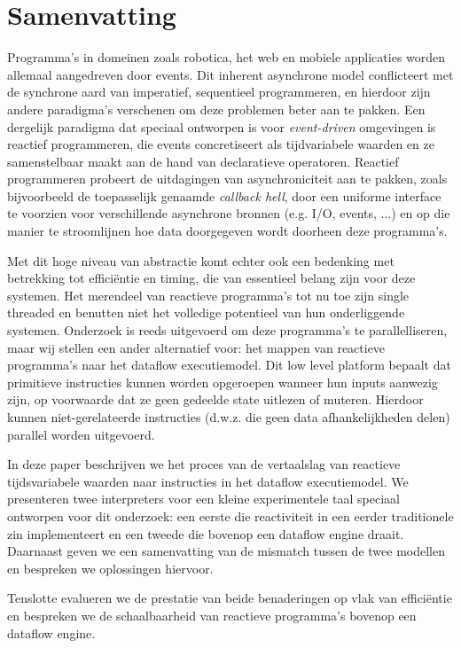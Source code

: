 \section*{Samenvatting}

Programma's in domeinen zoals robotica, het web en mobiele applicaties worden allemaal aangedreven door events. Dit inherent asynchrone model conflicteert met de synchrone aard van imperatief, sequentieel programmeren, en hierdoor zijn andere paradigma's verschenen om deze problemen beter aan te pakken. Een dergelijk paradigma dat speciaal ontworpen is voor \textit{event-driven} omgevingen is reactief programmeren, die events concretiseert als tijdvariabele waarden en ze samenstelbaar maakt aan de hand van declaratieve operatoren. Reactief programmeren probeert de uitdagingen van asynchroniciteit aan te pakken, zoals bijvoorbeeld de toepasselijk genaamde \textit{callback hell}, door een uniforme interface te voorzien voor verschillende asynchrone bronnen (e.g. I/O, events, ...) en op die manier te stroomlijnen hoe data doorgegeven wordt doorheen deze programma's.

Met dit hoge niveau van abstractie komt echter ook een bedenking met betrekking tot efficiëntie en timing, die van essentieel belang zijn voor deze systemen. Het merendeel van reactieve programma's tot nu toe zijn single threaded en benutten niet het volledige potentieel van hun onderliggende systemen. Onderzoek is reeds uitgevoerd om deze programma's te parallelliseren, maar wij stellen een ander alternatief voor: het mappen van reactieve programma's naar het dataflow executiemodel. Dit low level platform bepaalt dat primitieve instructies kunnen worden opgeroepen wanneer hun inputs aanwezig zijn, op voorwaarde dat ze geen gedeelde state uitlezen of muteren. Hierdoor kunnen niet-gerelateerde instructies (d.w.z. die geen data afhankelijkheden delen) parallel worden uitgevoerd.

In deze paper beschrijven we het proces van de vertaalslag van reactieve tijdsvariabele waarden naar instructies in het dataflow executiemodel. We presenteren twee interpreters voor een kleine experimentele taal speciaal ontworpen voor dit onderzoek: een eerste die reactiviteit in een eerder traditionele zin implementeert en een tweede die bovenop een dataflow engine draait. Daarnaast geven we een samenvatting van de mismatch tussen de twee modellen en bespreken we oplossingen hiervoor.

Tenslotte evalueren we de prestatie van beide benaderingen op vlak van efficiëntie en bespreken we de schaalbaarheid van reactieve programma's bovenop een dataflow engine. 